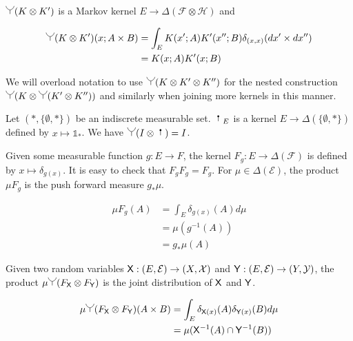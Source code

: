 $\splitter{0.15}(K\otimes K')$ is a Markov kernel $E\to \Delta(\mathcal{F}\otimes\mathcal{H})$ and

\begin{align}
    \splitter{0.15}(K\otimes K')(x;A\times B) &= \int_E K(x';A)K'(x'';B) \delta_{(x,x)} (dx'\times dx'')\\ 
                                              &= K(x;A)K'(x;B) \label{eq:outer_product}
\end{align}

We will overload notation to use $\splitter{0.15}(K\otimes K'\otimes K'')$ for the nested construction $\splitter{0.15}(K\otimes \splitter{0.15}(K'\otimes K''))$ and similarly when joining more kernels in this manner.

Let $(*,\{\emptyset,*\})$ be an indiscrete measurable set. $\stopper{0.15}_E$ is a kernel $E\to \Delta(\{\emptyset,*\})$ defined by $x\mapsto \mathds{1}_*$. We have $\splitter{0.15}(I\otimes \stopper{0.15}) = I$.

Given some measurable function $g:E\to F$, the kernel $F_g:E\to \Delta(\mathcal{F})$ is defined by $x\mapsto \delta_{g(x)}$. It is easy to check that $F_g F_g = F_g$. For $\mu\in \Delta(\mathcal{E})$, the product $\mu F_g$ is the push forward measure $g_*\mu$.

\begin{align}
    \mu F_g (A) &= \int_E \delta_{g(x)}(A) d\mu\\
                &= \mu(g^{-1}(A))\\
                &= g_*\mu(A)
\end{align}

Given two random variables $\mathsf{X}:(E,\mathcal{E})\to (X,\mathcal{X})$ and $\mathsf{Y}:(E,\mathcal{E})\to (Y,\mathcal{Y})$, the product $\mu\splitter{0.15}(F_{\RV{X}}\otimes F_{\RV{Y}})$ is the joint distribution of $\mathsf{X}$ and $\mathsf{Y}$.

\begin{align}
    \mu \splitter{0.15}(F_{\RV{X}}\otimes F_{\RV{Y}}) (A\times B) &= \int_E \delta_{\RV{X}(x)}(A) \delta_{\RV{Y}(x)}(B) d\mu \\
                        &= \mu(\RV{X}^{-1}(A)\cap \RV{Y}^{-1}(B))
\end{align}
